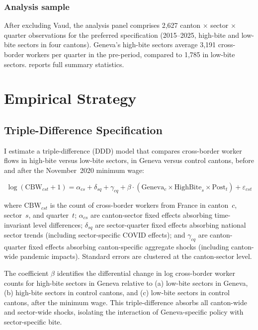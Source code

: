 \documentclass[12pt]{article}
\begin{document}
\subsubsection*{Analysis sample} After excluding Vaud, the analysis panel comprises 2,627 canton $\times$ sector $\times$ quarter observations for the preferred specification (2015--2025, high-bite and low-bite sectors in four cantons). Geneva's high-bite sectors average 3,191 cross-border workers per quarter in the pre-period, compared to 1,785 in low-bite sectors.  reports full summary statistics.




\section{Empirical Strategy}
\label{sec:strategy}

\subsection{Triple-Difference Specification}

I estimate a triple-difference (DDD) model that compares cross-border worker flows in high-bite versus low-bite sectors, in Geneva versus control cantons, before and after the November~2020 minimum wage:

\begin{equation}
\log(\text{CBW}_{cst} + 1) = \alpha_{cs} + \delta_{sq} + \gamma_{cq} + \beta \cdot (\text{Geneva}_c \times \text{HighBite}_s \times \text{Post}_t) + \varepsilon_{cst}
\label{eq:ddd}
\end{equation}

\noindent where $\text{CBW}_{cst}$ is the count of cross-border workers from France in canton~$c$, sector~$s$, and quarter~$t$; $\alpha_{cs}$ are canton-sector fixed effects absorbing time-invariant level differences; $\delta_{sq}$ are sector-quarter fixed effects absorbing national sector trends (including sector-specific COVID effects); and $\gamma_{cq}$ are canton-quarter fixed effects absorbing canton-specific aggregate shocks (including canton-wide pandemic impacts). Standard errors are clustered at the canton-sector level.

The coefficient $\beta$ identifies the differential change in log cross-border worker counts for high-bite sectors in Geneva relative to (a) low-bite sectors in Geneva, (b) high-bite sectors in control cantons, and (c) low-bite sectors in control cantons, after the minimum wage. This triple-difference absorbs all canton-wide and sector-wide shocks, isolating the interaction of Geneva-specific policy with sector-specific bite.
\end{document}
